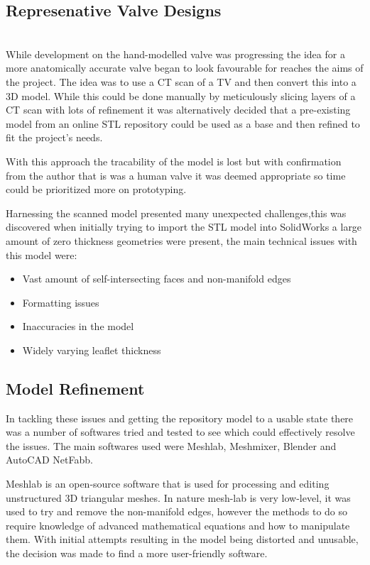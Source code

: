 \subsection{Represenative Valve Designs}

\\
While development on the hand-modelled valve was progressing the idea for a more anatomically accurate valve began to look favourable for reaches the aims of the project. The idea was to use a \gls{CT} scan of a \gls{TV} and then convert this into a 3D model. While this could be done manually by meticulously slicing layers of a \gls{CT} scan with lots of refinement it was alternatively decided that a pre-existing model from an online STL repository could be used as a base and then refined to fit the project's needs.

With this approach the tracability of the model is lost but with confirmation from the author that is was a human valve it was deemed appropriate so time could be prioritized more on prototyping.

Harnessing the scanned model presented many unexpected challenges,this was discovered when initially trying to import the STL model into SolidWorks a large amount of zero thickness geometries were present, the main technical issues with this model were:
\begin{itemize}
    \item Vast amount of self-intersecting faces and non-manifold edges
    \item Formatting issues
    \item Inaccuracies in the model
    \item Widely varying leaflet thickness
\end{itemize}

\subsection{Model Refinement}
In tackling these issues and getting the repository model to a usable state there was a number of softwares tried and tested to see which could effectively resolve the issues. The main softwares used were Meshlab, Meshmixer, Blender and AutoCAD NetFabb.

Meshlab is an open-source software that is used for processing and editing unstructured 3D triangular meshes. In nature mesh-lab is very low-level,  it was used to try and remove the non-manifold edges, however the methods to do so require knowledge of advanced mathematical equations and how to manipulate them. With initial attempts resulting in the model being distorted and unusable, the decision was made to find a more user-friendly software.

